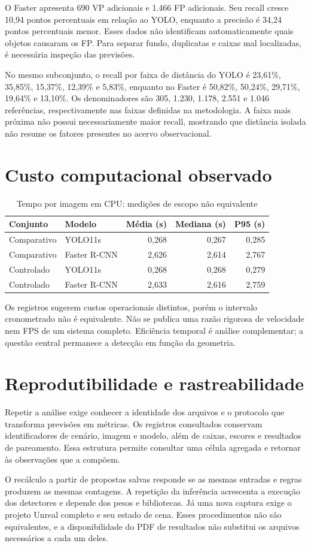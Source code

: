 O Faster apresenta 690 VP adicionais e 1.466 FP adicionais. Seu recall cresce 10,94 pontos percentuais em relação ao YOLO, enquanto a precisão é 34,24 pontos percentuais menor. Esses dados não identificam automaticamente quais objetos causaram os FP. Para separar fundo, duplicatas e caixas mal localizadas, é necessária inspeção das previsões.

No mesmo subconjunto, o recall por faixa de distância do YOLO é 23,61\%, 35,85\%, 15,37\%, 12,39\% e 5,83\%, enquanto no Faster é 50,82\%, 50,24\%, 29,71\%, 19,64\% e 13,10\%. Os denominadores são 305, 1.230, 1.178, 2.551 e 1.046 referências, respectivamente nas faixas definidas na metodologia. A faixa mais próxima não possui necessariamente maior recall, mostrando que distância isolada não resume os fatores presentes no acervo observacional.

\section{Custo computacional observado}
\begin{table}[htb]
\caption{Tempo por imagem em CPU: medições de escopo não equivalente}
\label{tab:tempo}\centering\small
\begin{tabular}{llrrr}
\hline Conjunto & Modelo & Média (s) & Mediana (s) & P95 (s)\\\hline
Comparativo & YOLO11s & 0,268 & 0,267 & 0,285\\
Comparativo & Faster R-CNN & 2,626 & 2,614 & 2,767\\
Controlado & YOLO11s & 0,268 & 0,268 & 0,279\\
Controlado & Faster R-CNN & 2,633 & 2,616 & 2,759\\\hline
\end{tabular}
\end{table}

Os registros sugerem custos operacionais distintos, porém o intervalo cronometrado não é equivalente. Não se publica uma razão rigorosa de velocidade nem FPS de um sistema completo. Eficiência temporal é análise complementar; a questão central permanece a detecção em função da geometria.

\section{Reprodutibilidade e rastreabilidade}
Repetir a análise exige conhecer a identidade dos arquivos e o protocolo que transforma previsões em métricas. Os registros consultados conservam identificadores de cenário, imagem e modelo, além de caixas, escores e resultados de pareamento. Essa estrutura permite consultar uma célula agregada e retornar às observações que a compõem.

O recálculo a partir de propostas salvas responde se as mesmas entradas e regras produzem as mesmas contagens. A repetição da inferência acrescenta a execução dos detectores e depende dos pesos e bibliotecas. Já uma nova captura exige o projeto Unreal completo e seu estado de cena. Esses procedimentos não são equivalentes, e a disponibilidade do PDF de resultados não substitui os arquivos necessários a cada um deles.

